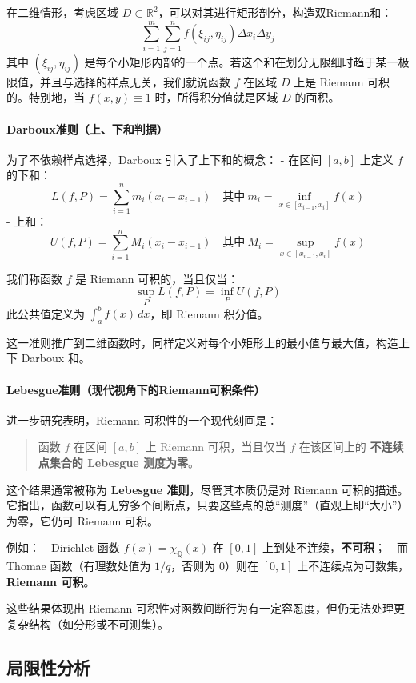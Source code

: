 \documentclass[a4paper, oneside]{article}
\begin{document}
在二维情形，考虑区域 $D \subset \mathbb{R}^2$，可以对其进行矩形剖分，构造双Riemann和：
\[
\sum_{i=1}^{m} \sum_{j=1}^{n} f(\xi_{ij}, \eta_{ij}) \Delta x_i \Delta y_j
\]
其中 $(\xi_{ij}, \eta_{ij})$ 是每个小矩形内部的一个点。若这个和在划分无限细时趋于某一极限值，并且与选择的样点无关，我们就说函数 $f$ 在区域 $D$ 上是 Riemann 可积的。特别地，当 $f(x,y) \equiv 1$ 时，所得积分值就是区域 $D$ 的面积。

\paragraph{Darboux准则（上、下和判据）}

为了不依赖样点选择，Darboux 引入了上下和的概念：
- 在区间 $[a,b]$ 上定义 $f$ 的下和：
\[
L(f,P) = \sum_{i=1}^{n} m_i(x_i - x_{i-1}) \quad \text{其中} \ m_i = \inf_{x \in [x_{i-1}, x_i]} f(x)
\]
- 上和：
\[
U(f,P) = \sum_{i=1}^{n} M_i(x_i - x_{i-1}) \quad \text{其中} \ M_i = \sup_{x \in [x_{i-1}, x_i]} f(x)
\]

我们称函数 $f$ 是 Riemann 可积的，当且仅当：
\[
\sup_{P} L(f,P) = \inf_{P} U(f,P)
\]
此公共值定义为 $\int_a^b f(x)\,dx$，即 Riemann 积分值。

这一准则推广到二维函数时，同样定义对每个小矩形上的最小值与最大值，构造上下 Darboux 和。

\paragraph{Lebesgue准则（现代视角下的Riemann可积条件）}

进一步研究表明，Riemann 可积性的一个现代刻画是：
\begin{quote}
函数 $f$ 在区间 $[a,b]$ 上 Riemann 可积，当且仅当 $f$ 在该区间上的 \textbf{不连续点集合的 Lebesgue 测度为零}。
\end{quote}

这个结果通常被称为 \textbf{Lebesgue 准则}，尽管其本质仍是对 Riemann 可积的描述。它指出，函数可以有无穷多个间断点，只要这些点的总“测度”（直观上即“大小”）为零，它仍可 Riemann 可积。

例如：
- Dirichlet 函数 $f(x) = \chi_{\mathbb{Q}}(x)$ 在 $[0,1]$ 上到处不连续，\textbf{不可积}；
- 而 Thomae 函数（有理数处值为 $1/q$，否则为 $0$）则在 $[0,1]$ 上不连续点为可数集，\textbf{Riemann 可积}。

这些结果体现出 Riemann 可积性对函数间断行为有一定容忍度，但仍无法处理更复杂结构（如分形或不可测集）。

\subsection{局限性分析}
\end{document}
